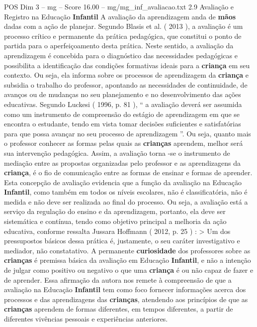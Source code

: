 \begin{textsample}{POS Dim 3 – mg – Score 16.00 – mg/mg\_inf\_avaliacao.txt}  \label{ex:f3_pos_265}
2.9 Avaliação e Registro na Educação \textbf{Infantil} A avaliação da aprendizagem anda de \textbf{mãos} dadas com a ação de planejar.
Segundo Blasis et al. ( 2013 ), a avaliação é um processo crítico e permanente da prática pedagógica, que constitui o ponto de partida para o aperfeiçoamento desta prática.
Neste sentido, a avaliação da aprendizagem é concebida para o diagnóstico das necessidades pedagógicas e possibilita a identificação das condições formativas ideais para a \textbf{criança} em seu contexto.
Ou seja, ela informa sobre os processos de aprendizagem da \textbf{criança} e subsidia o trabalho do professor, apontando as necessidades de continuidade, de avanços ou de mudanças no seu planejamento e no desenvolvimento das ações educativas.
Segundo Luckesi ( 1996, p. 81 ), “ a avaliação deverá ser assumida como um instrumento de compreensão do estágio de aprendizagem em que se encontra o estudante, tendo em vista tomar decisões suficientes e satisfatórias para que possa avançar no seu processo de aprendizagem ”.
Ou seja, quanto mais o professor conhecer as formas pelas quais as \textbf{crianças} aprendem, melhor será sua intervenção pedagógica.
Assim, a avaliação torna -se o instrumento de mediação entre as propostas organizadas pelo professor e as aprendizagens da \textbf{criança}, é o fio de comunicação entre as formas de ensinar e formas de aprender.
Esta concepção de avaliação evidencia que a função da avaliação na Educação \textbf{Infantil}, como também em todos os níveis escolares, não é classificatória, não é medida e não deve ser realizada ao final do processo.
Ou seja, a avaliação está a serviço da regulação do ensino e da aprendizagem, portanto, ela deve ser sistemática e contínua, tendo como objetivo principal a melhoria da ação educativa, conforme ressalta Jussara Hoffmann ( 2012, p. 25 ) : > Um dos pressupostos básicos dessa prática é, justamente, o seu caráter investigativo e mediador, não constatativo.
A permanente \textbf{curiosidade} dos professores sobre as \textbf{crianças} é premissa básica da avaliação em Educação \textbf{Infantil}, e não a intenção de julgar como positivo ou negativo o que uma \textbf{criança} é ou não capaz de fazer e de aprender.
Essa afirmação da autora nos remete à compreensão de que a avaliação na Educação \textbf{Infantil} tem como foco fornecer informações acerca dos processos e das aprendizagens das \textbf{crianças}, atendendo aos princípios de que as \textbf{crianças} aprendem de formas diferentes, em tempos diferentes, a partir de diferentes vivências pessoais e experiências anteriores.

\end{textsample}
